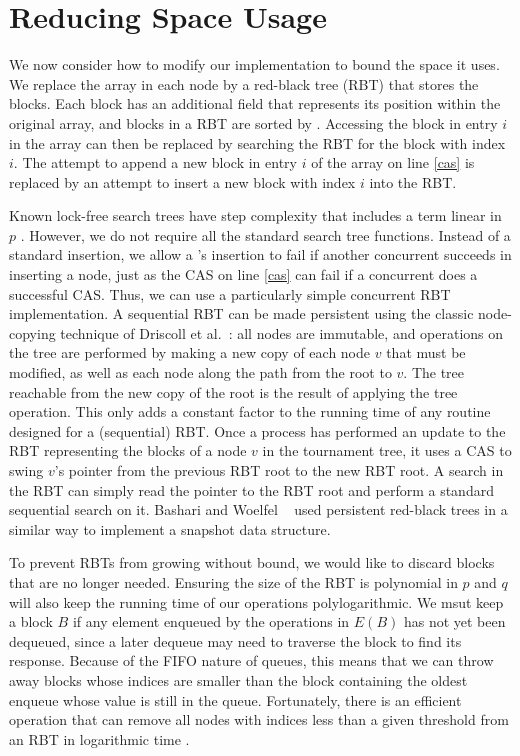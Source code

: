 
\section{Reducing Space Usage}
\label{reducing}

We now consider how to modify our implementation to bound the space it uses.
We replace the  array in each node by a red-black tree (RBT)
that stores the blocks.
Each block has an additional  field
that represents its position within the original  array, and
blocks in a RBT are sorted by .
Accessing the block in entry $i$ in the  array can then be 
replaced by searching the RBT for the block with index $i$.
The attempt to append a new block in entry $i$ of the  array on line \ref{cas}
is replaced by an attempt to insert a new block with index $i$ into the RBT.
 
Known lock-free search trees have step complexity that includes a term linear in $p$ \cite{EFHR14,Ko20}.  
However, we do not require all the standard search tree functions.
Instead of a standard insertion, we allow a 's insertion to fail if another
concurrent  succeeds in inserting a node, just as the CAS on line \ref{cas}
can fail if a concurrent  does a successful CAS.
Thus, we can use a particularly simple concurrent RBT implementation.
A sequential RBT can be made persistent using the classic node-copying technique of 
Driscoll et al.~\cite{DSST89}:  all nodes are immutable, and operations on the 
tree are performed by making a new copy of each node $v$ that must be modified, as well
as each node along the path from the root to $v$.
The tree reachable from the new copy of the root is the result of applying the tree operation.
This only adds a constant factor to the running time of any routine designed for a (sequential) RBT.
Once a process has performed an update to the RBT representing the blocks of a node 
$v$ in the tournament tree, 
it uses a CAS to swing $v$'s pointer from the previous RBT root to the new RBT root.
A search in the RBT can simply read the pointer to the RBT root and perform a standard
sequential search on it.
Bashari and Woelfel ~\cite{DBLP:conf/podc/BashariW21} used persistent red-black trees in a similar way to implement a snapshot data structure.

To prevent RBTs from growing without bound, we would like to discard
blocks that are no longer needed.
Ensuring the size of the RBT is polynomial in $p$ and $q$ will 
also keep the running time of our operations polylogarithmic.
We msut keep a block $B$ if any element enqueued by the operations in $E(B)$ has
not yet been dequeued, since a later dequeue may need to traverse the block to 
find its response.
Because of the FIFO nature of queues, this means that we can throw away 
blocks whose indices are smaller than the block containing the oldest enqueue whose
value is still in the queue.
Fortunately, there is an efficient  operation that can remove
all nodes with indices less than a given threshold from an RBT in logarithmic time \cite[Sec.~4.2]{Tar83}.

